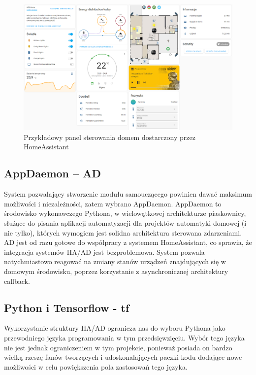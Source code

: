 \begin{figure}
    \centering\includegraphics[width=1.00\textwidth]{img/ha_dashboard.png}
    \caption{Przykładowy panel sterowania domem dostarczony przez HomeAssistant} \label{fig:dashboard_example}
\end{figure}


\subsection{AppDaemon -- AD}
System pozwalający stworzenie modułu samouczącego powinien dawać maksimum możliwości i niezależności, zatem wybrano AppDaemon. AppDaemon to środowisko wykonawczego Pythona, w wielowątkowej architekturze piaskownicy, służące do pisania aplikacji automatyzacji dla projektów automatyki domowej (i nie tylko), których wymogiem jest solidna architektura sterowana zdarzeniami. AD jest od razu gotowe do współpracy z systemem HomeAssistant, co sprawia, że integracja systemów HA/AD jest bezproblemowa. System pozwala natychmiastowo reagować na zmiany stanów urządzeń znajdujących się w domowym środowisku, poprzez korzystanie z asynchronicznej architektury callback.

\subsection{Python i Tensorflow - tf}
Wykorzystanie struktury HA/AD ogranicza nas do wyboru Pythona jako przewodniego języka programowania w tym przedsięwzięciu. Wybór tego języka nie jest jednak ograniczeniem w tym projekcie, ponieważ posiada on bardzo wielką rzeszę fanów tworzących i udoskonalających paczki kodu dodające nowe możliwości w celu powiększenia pola zastosowań tego języka.

